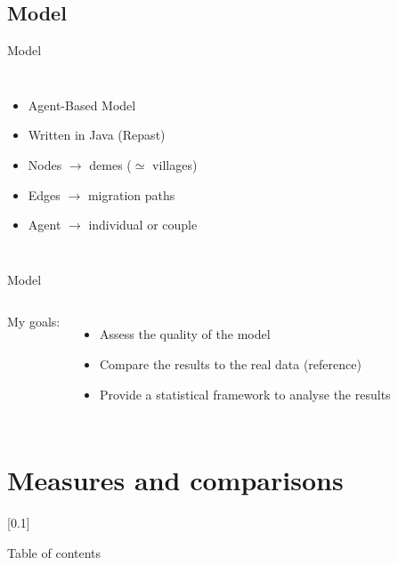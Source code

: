 \documentclass[10pt, aspectratio=43]{beamer}
\begin{document}
\subsection{Model}
\begin{frame}{}{Model}
\vspace*{-0.8cm}
\begin{columns}

  \color{masseyWhite}
  \begin{itemize}
    \item Agent-Based Model
    \item Written in Java (Repast)
    \item Nodes $\rightarrow$ demes ($\simeq$ villages)
    \item Edges $\rightarrow$ migration paths
    \item Agent $\rightarrow$ individual or couple
  \end{itemize}

\end{columns}
\end{frame}

\begin{frame}{}{Model}
\vspace*{-0.8cm}
\begin{columns}

  \color{masseyWhite}
  My goals:
  \begin{itemize}
    \item Assess the quality of the model
    \item Compare the results to the real data (reference)
    \item Provide a statistical framework to analyse the results
  \end{itemize}

\end{columns}
\end{frame}


\section{Measures and comparisons}
[0.1]{}{}{}
\begin{frame}{}{Table of contents}
\tableofcontents[currentsection, subsectionstyle=show/show/hide, subsubsectionstyle=show/show/show/shaded]
\end{frame}
\end{document}
